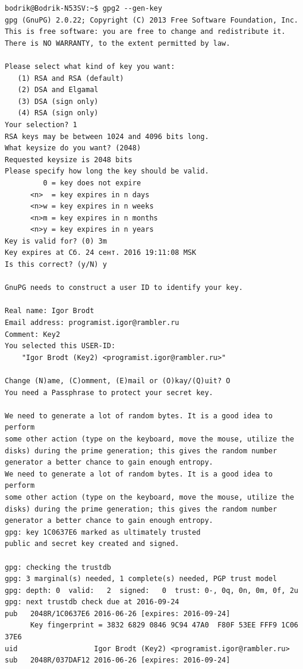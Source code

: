 \begin{verbatim}
bodrik@Bodrik-N53SV:~$ gpg2 --gen-key
gpg (GnuPG) 2.0.22; Copyright (C) 2013 Free Software Foundation, Inc.
This is free software: you are free to change and redistribute it.
There is NO WARRANTY, to the extent permitted by law.

Please select what kind of key you want:
   (1) RSA and RSA (default)
   (2) DSA and Elgamal
   (3) DSA (sign only)
   (4) RSA (sign only)
Your selection? 1
RSA keys may be between 1024 and 4096 bits long.
What keysize do you want? (2048) 
Requested keysize is 2048 bits
Please specify how long the key should be valid.
         0 = key does not expire
      <n>  = key expires in n days
      <n>w = key expires in n weeks
      <n>m = key expires in n months
      <n>y = key expires in n years
Key is valid for? (0) 3m
Key expires at Сб. 24 сент. 2016 19:11:08 MSK
Is this correct? (y/N) y

GnuPG needs to construct a user ID to identify your key.

Real name: Igor Brodt
Email address: programist.igor@rambler.ru
Comment: Key2
You selected this USER-ID:
    "Igor Brodt (Key2) <programist.igor@rambler.ru>"

Change (N)ame, (C)omment, (E)mail or (O)kay/(Q)uit? O
You need a Passphrase to protect your secret key.

We need to generate a lot of random bytes. It is a good idea to perform
some other action (type on the keyboard, move the mouse, utilize the
disks) during the prime generation; this gives the random number
generator a better chance to gain enough entropy.
We need to generate a lot of random bytes. It is a good idea to perform
some other action (type on the keyboard, move the mouse, utilize the
disks) during the prime generation; this gives the random number
generator a better chance to gain enough entropy.
gpg: key 1C0637E6 marked as ultimately trusted
public and secret key created and signed.

gpg: checking the trustdb
gpg: 3 marginal(s) needed, 1 complete(s) needed, PGP trust model
gpg: depth: 0  valid:   2  signed:   0  trust: 0-, 0q, 0n, 0m, 0f, 2u
gpg: next trustdb check due at 2016-09-24
pub   2048R/1C0637E6 2016-06-26 [expires: 2016-09-24]
      Key fingerprint = 3832 6829 0846 9C94 47A0  F80F 53EE FFF9 1C06 37E6
uid                  Igor Brodt (Key2) <programist.igor@rambler.ru>
sub   2048R/037DAF12 2016-06-26 [expires: 2016-09-24]

\end{verbatim}

